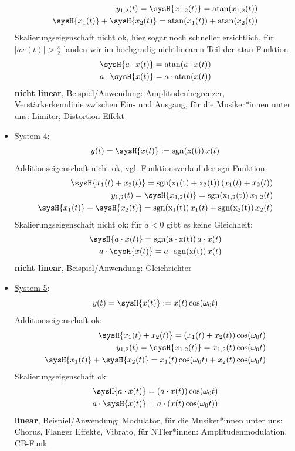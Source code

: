 \begin{Loesung}
\begin{itemize}
\begin{align}
y_{1,2}(t) = \sysH{x_{1,2}(t)}= \mathrm{atan}(x_{1,2}(t))\\
\sysH{x_1(t)} + \sysH{x_2(t)} = \mathrm{atan}(x_1(t)) + \mathrm{atan}(x_2(t))
\end{align}
Skalierungseigenschaft nicht ok, hier sogar noch schneller ersichtlich, für
$|a x(t)|>\frac{\pi}{2}$ landen wir im hochgradig nichtlinearen Teil der atan-Funktion
\begin{align}
\sysH{a \cdot x(t)}= \mathrm{atan}(a \cdot x(t))\\
a \cdot \sysH{x(t)}= a \cdot \mathrm{atan}(x(t))
\end{align}
\textbf{nicht linear}, Beispiel/Anwendung: Amplitudenbegrenzer, Verstärkerkennlinie
zwischen Ein- und Ausgang, für die Musiker*innen unter uns: Limiter, Distortion Effekt
\item  \underline{System 4}:
\begin{equation}
y(t) = \sysH{x(t)}:= \mathrm{sgn(x(t))} \, x(t)
\end{equation}
Additionseigenschaft nicht ok, vgl. Funktionsverlauf der sgn-Funktion:
\begin{align}
\sysH{x_1(t)+x_2(t)}=\mathrm{sgn(x_1(t)+x_2(t))} \, (x_1(t)+x_2(t))\\
y_{1,2}(t) = \sysH{x_{1,2}(t)}= \mathrm{sgn(x_{1,2}(t))} \, x_{1,2}(t)\\
\sysH{x_1(t)} + \sysH{x_2(t)} = \mathrm{sgn(x_{1}(t))} \, x_{1}(t) + \mathrm{sgn(x_{2}(t))} \, x_{2}(t)
\end{align}
Skalierungseigenschaft nicht ok: für $a<0$ gibt es keine Gleichheit:
\begin{align}
\sysH{a \cdot x(t)}= \mathrm{sgn( a \cdot x(t))} \, a \cdot x(t)\\
a \cdot \sysH{x(t)}= a \cdot \mathrm{sgn(x(t))} \, x(t)
\end{align}
\textbf{nicht linear}, Beispiel/Anwendung: Gleichrichter
\item  \underline{System 5}:
\begin{equation}
y(t) = \sysH{x(t)}:= x(t) \cos(\omega_0 t)
\end{equation}
Additionseigenschaft ok:
\begin{align}
\sysH{x_1(t)+x_2(t)}=(x_1(t) + x_2(t)) \cos(\omega_0 t)\\
y_{1,2}(t) = \sysH{x_{1,2}(t)}= x_{1,2}(t) \cos(\omega_0 t)\\
\sysH{x_1(t)} + \sysH{x_2(t)} = x_{1}(t) \cos(\omega_0 t) + x_{2}(t) \cos(\omega_0 t)
\end{align}
Skalierungseigenschaft ok:
\begin{align}
\sysH{a \cdot x(t)}= (a \cdot x(t)) \cos(\omega_0 t)\\
a \cdot \sysH{x(t)}= a \cdot (x(t) \cos(\omega_0 t))
\end{align}
\textbf{linear}, Beispiel/Anwendung: Modulator, für die Musiker*innen unter uns:
Chorus, Flanger Effekte, Vibrato, für NTler*innen: Amplitudenmodulation, CB-Funk


\end{itemize}
\end{Loesung}
